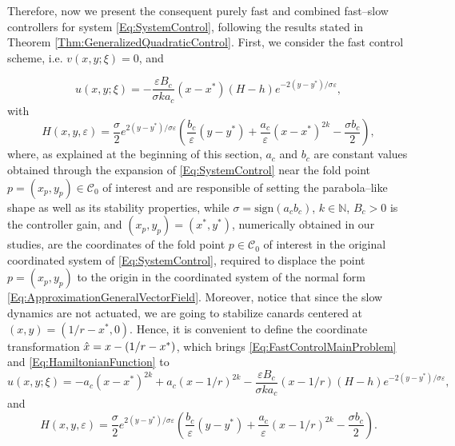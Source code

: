 \documentclass[3p]{elsarticle}
\theoremstyle{plain}
\theoremstyle{remark}
\theoremstyle{definition}
\begin{document}
    Therefore, now we present the consequent purely fast and combined fast--slow controllers for system \eqref{Eq:SystemControl}, following the results stated in Theorem \ref{Thm:GeneralizedQuadraticControl}.
    First, we consider the fast control scheme, i.e. $v(x,y;\xi)=0$, and
    
    \begin{equation}
        u(x,y;\xi) = - \frac{\varepsilon B_{c}}{\sigma k a_{c}}\left( x-x^{*} \right)(H-h)e^{-2\left(y - y^{*}\right)/\sigma \varepsilon},
        \label{Eq:FastControlMainProblem}
    \end{equation}
    with 
    \begin{equation}
        H\left( x, y,\varepsilon \right) = \frac{\sigma}{2}e^{2\left(y - y^{*}\right)/\sigma \varepsilon}\left( \frac{b_{c}}{\varepsilon}\left( y-y^{*} \right) + \frac{a_{c}}{\varepsilon}\left( x-x^{*} \right)^{2k} - \frac{\sigma b_{c}}{2} \right),
    \label{Eq:HamiltonianFunction}
    \end{equation}
    where, as explained at the beginning of this section, $a_{c}$ and $b_{c}$ are constant values obtained through the expansion of \eqref{Eq:SystemControl} near the fold point $p=(x_{p}, y_{p})\in\mathcal{C}_{0}$ of interest and are responsible of setting the parabola--like shape as well as its stability properties, while $\sigma = \text{sign}(a_{c} b_{c})$, $k\in\mathbb{N}$, $B_{c} > 0$ is the controller gain, and $(x_{p}, y_{p}) = \left( x^{*}, y^{*} \right)$, numerically obtained in our studies, are the coordinates of the fold point $p\in\mathcal{C}_{0}$ of interest in the original coordinated system of \eqref{Eq:SystemControl}, required to displace the point $p = (x_p,y_p)$ to the origin in the coordinated system of the normal form \eqref{Eq:ApproximationGeneralVectorField}. Moreover, notice that since the slow dynamics are not actuated, we are going to stabilize canards centered at $(x, y) = \left(1/r - x^{*}, 0 \right)$. Hence, it is convenient to define the coordinate transformation $\Hat{x} = x - \left(1/r -x^{*} \right)$, which brings \eqref{Eq:FastControlMainProblem} and \eqref{Eq:HamiltonianFunction} to
    \begin{equation}
        u(x,y;\xi) = -a_{c}\left( x-x^{*} \right)^{2k} + a_{c}\left( x-1/r \right)^{2k}  - \frac{\varepsilon B_{c}}{\sigma k a_{c}}\left( x-1/r \right)(H-h)e^{-2\left(y - y^{*}\right)/\sigma \varepsilon},
        \label{Eq:FastControlMainProblemFinal}
    \end{equation}
    and 
    \begin{equation}
        H\left( x, y,\varepsilon \right) = \frac{\sigma}{2}e^{2\left(y - y^{*}\right)/\sigma \varepsilon}\left( \frac{b_{c}}{\varepsilon}\left( y-y^{*} \right) + \frac{a_{c}}{\varepsilon}\left( x-1/r \right)^{2k} - \frac{\sigma b_{c}}{2} \right).
    \label{Eq:HamiltonianFunctionFinal}
    \end{equation}
    
\end{document}
